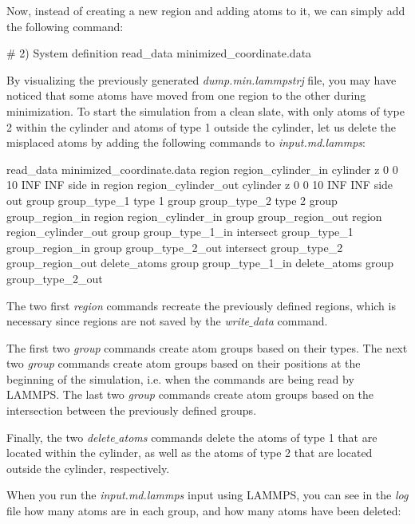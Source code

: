\noindent Now, instead of creating a new region and adding atoms to it, we
can simply add the following command:

\begin{lcverbatim}
# 2) System definition
read_data minimized_coordinate.data
\end{lcverbatim}

\noindent By visualizing the previously generated \textit{dump.min.lammpstrj}
file, you may have noticed that some atoms have moved from
one region to the other during minimization.
To start the simulation from a clean slate, with
only atoms of type 2 within the cylinder and atoms of type
1 outside the cylinder, let us delete the misplaced atoms
by adding the following commands to \textit{input.md.lammps}:

\begin{lcverbatim}
read_data minimized_coordinate.data
region region_cylinder_in cylinder z 0 0 10 INF INF side in
region region_cylinder_out cylinder z 0 0 10 INF INF side out
group group_type_1 type 1
group group_type_2 type 2
group group_region_in region region_cylinder_in
group group_region_out region region_cylinder_out
group group_type_1_in intersect group_type_1 group_region_in
group group_type_2_out intersect group_type_2 group_region_out
delete_atoms group group_type_1_in
delete_atoms group group_type_2_out
\end{lcverbatim}

\noindent The two first \textit{region} commands recreate
the previously defined regions, which is necessary since
regions are not saved by the \textit{write$\_$data} command.

\vspace{0.25cm} \noindent The first two \textit{group} commands create atom groups based on their types.
The next two \textit{group} commands create atom groups based on their
positions at the beginning of the simulation, i.e. when the commands
are being read by LAMMPS.
The last two \textit{group} commands create atom groups based on the intersection
between the previously defined groups.

\vspace{0.25cm} \noindent Finally, the two \textit{delete$\_$atoms} commands delete the
atoms of type 1 that are located within the cylinder, as
well as the atoms of type 2 that are located outside the
cylinder, respectively. 

\vspace{0.25cm} \noindent When you run the \textit{input.md.lammps} input using LAMMPS, you
can see in the \textit{log} file how many atoms are in each group,
and how many atoms have been deleted:

